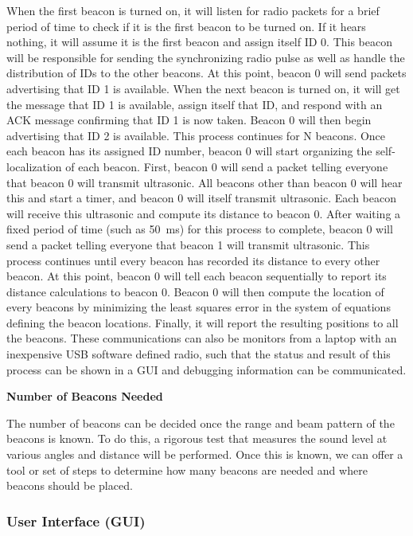 \documentclass{article}
\begin{document}
      When the first beacon is turned on, it will listen for radio packets for a brief period of time to check if it is the first beacon to be turned on. If it hears nothing, it will assume it is the first beacon and assign itself ID 0. This beacon will be responsible for sending the synchronizing radio pulse as well as handle the distribution of IDs to the other beacons. At this point, beacon 0 will send packets advertising that ID 1 is available. When the next beacon is turned on, it will get the message that ID 1 is available, assign itself that ID, and respond with an ACK message confirming that ID 1 is now taken. Beacon 0 will then begin advertising that ID 2 is available. This process continues for N beacons. Once each beacon has its assigned ID number, beacon 0 will start organizing the self-localization of each beacon. First, beacon 0 will send a packet telling everyone that beacon 0 will transmit ultrasonic. All beacons other than beacon 0 will hear this and start a timer, and beacon 0 will itself transmit ultrasonic. Each beacon will receive this ultrasonic and compute its distance to beacon 0. After waiting a fixed period of time (such as \SI{50}{\milli\second}) for this process to complete, beacon 0 will send a packet telling everyone that beacon 1 will transmit ultrasonic. This process continues until every beacon has recorded its distance to every other beacon. At this point, beacon 0 will tell each beacon sequentially to report its distance calculations to beacon 0. Beacon 0 will then compute the location of every beacons by minimizing the least squares error in the system of equations defining the beacon locations. Finally, it will report the resulting positions to all the beacons. These communications can also be monitors from a laptop with an inexpensive USB software defined radio, such that the status and result of this process can be shown in a GUI and debugging information can be communicated.

      \textbf{Number of Beacons Needed}

      The number of beacons can be decided once the range and beam pattern of the beacons is known. To do this, a rigorous test that measures the sound level at various angles and distance will be performed. Once this is known, we can offer a tool or set of steps to determine how many beacons are needed and where beacons should be placed.

    \subsubsection{User Interface (GUI)}
\end{document}
